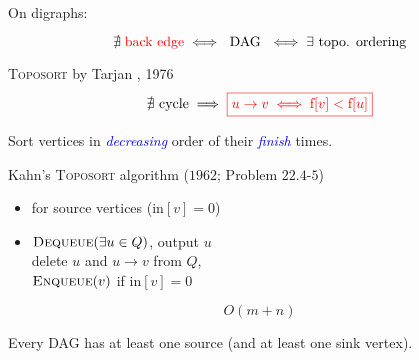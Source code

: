 
\begin{frame}{}
  \centerline{\large On digraphs:}
  \[
    \nexists\; \text{\textcolor{red}{back edge}} \iff \text{ DAG } \iff \exists \text{ topo. ordering}
  \]

  \pause
  \begin{block}{\textsc{Toposort} by Tarjan , 1976}
    \vspace{0.30cm}
    \[
      \nexists \text{ cycle} \implies \textcolor{red}{\boxed{u \to v \iff \text{f}[v] < \text{f}[u]}}
    \]

    \pause
    \vspace{0.50cm}
    \centerline{Sort vertices in \textcolor{blue}{\emph{decreasing}} order of their \textcolor{blue}{\emph{finish}} times.}
  \end{block}
\end{frame}

\begin{frame}{}
  \begin{exampleblock}{Kahn's \textsc{Toposort} algorithm ($1962$; Problem $22.4$-$5$) }
    \begin{itemize}
      \setlength{\itemsep}{5pt}
      \item {} for source vertices ($\text{in}[v] = 0$)
      \item {} $\textsc{Dequeue}(\exists u \in Q)$, output $u$ \\[6pt]
	\hspace{1.3cm} delete $u$ and $u \to v$ from $Q$, \\[5pt]
	\hspace{1.3cm} $\textsc{Enqueue}(v)$ if $\text{in}[v] = 0$
    \end{itemize}
  \end{exampleblock}

  \pause
  \[
    O(m + n)
  \]

  \pause
  \begin{lemma}
    Every DAG has at least one source (and at least one sink vertex).
  \end{lemma}

  \pause
  \vspace{0.50cm}
  \centerline{}
\end{frame}
